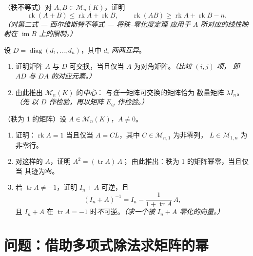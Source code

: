 \begin{exercise}[$\star\star\star$]\label{exo:b1:matrices:10}
（秩不等式）对 $A, B \in \mathcal{M}_n(K)$，证明
\[
\operatorname{rk}(A + B) \leq \operatorname{rk} A +
\operatorname{rk} B,
\qquad
\operatorname{rk}(AB) \geq \operatorname{rk} A + \operatorname{rk}
B - n .
\]
\emph{（对第二式 --- 西尔维斯特不等式 --- 将秩–零化度定理
应用于 $A$ 所对应的线性映射在
$\operatorname{im} B$ 上的限制。）}
\end{exercise}

\begin{exercise}[$\star\star$]\label{exo:b1:matrices:11}
设 $D = \operatorname{diag}(d_1, \dots, d_n)$，其中 $d_i$
\emph{两两互异}。
\begin{enumerate}
  \item 证明矩阵 $A$ 与 $D$ 可交换，当且仅当
        $A$ 为对角矩阵。\emph{（比较 $(i,j)$ 项，
        即 $AD$ 与 $DA$ 的对应元素。）}
  \item 由此推出 $\mathcal{M}_n(K)$ 的\emph{中心}：
        与\emph{任一}矩阵可交换的矩阵恰为
        数量矩阵 $\lambda I_n$。\emph{（先
        以 $D$ 作检验，再以矩阵 $E_{ij}$ 作检验。）}
\end{enumerate}
\end{exercise}

\begin{exercise}[$\star\star\star$]\label{exo:b1:matrices:12}
（秩为 1 的矩阵）设 $A \in \mathcal{M}_n(K)$，$A \neq 0$。
\begin{enumerate}
  \item 证明：$\operatorname{rk} A = 1$ 当且仅当 $A =
        CL$，其中 $C \in \mathcal{M}_{n,1}$ 为非零列，
        $L \in \mathcal{M}_{1,n}$ 为非零行。
  \item 对这样的 $A$，证明 $A^2 = (\operatorname{tr} A)\,A$；
        由此推出：秩为 1 的矩阵幂零，当且仅当
        其迹为零。
  \item 若 $\operatorname{tr} A \neq -1$，证明 $I_n + A$
        可逆，且
        \[
        (I_n + A)^{-1} = I_n - \frac{1}{1 + \operatorname{tr}
        A}\,A ,
        \]
        且 $I_n + A$ 在
        $\operatorname{tr} A = -1$ 时\emph{不}可逆。\emph{（求一个被
        $I_n + A$ 零化的向量。）}
\end{enumerate}
\end{exercise}

\section{问题：借助多项式除法求矩阵的幂}

